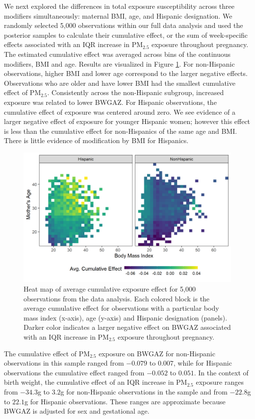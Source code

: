 \documentclass[12pt]{article}
\begin{document}
We next explored the differences in total exposure susceptibility across three modifiers simultaneously: maternal BMI, age, and Hispanic designation. We randomly selected 5,000 observations within our full data analysis and used the posterior samples to calculate their cumulative effect, or the sum of week-specific effects associated with an IQR increase in PM$_{2.5}$ exposure throughout pregnancy. The estimated cumulative effect was averaged across bins of the continuous modifiers, BMI and age. Results are visualized in Figure \ref{fig:avg_cumulative_effect}. For non-Hispanic observations, higher BMI and lower age correspond to the larger negative effects. Observations who are older and have lower BMI had the smallest cumulative effect of PM$_{2.5}$. Consistently across the non-Hispanic subgroup, increased exposure was related to lower BWGAZ. For Hispanic observations, the cumulative effect of exposure was centered around zero. We see evidence of a larger negative effect of exposure for younger Hispanic women; however this effect is less than the cumulative effect for non-Hispanics of the same age and BMI. There is little evidence of modification by BMI for Hispanics. 

\begin{figure}[!ht]
    \centering
    \includegraphics[height=7cm]{img/bwgaz_ce_heat_map.png}
    \caption{Heat map of average cumulative exposure effect for 5,000 observations from the data analysis. Each colored block is the average cumulative effect for observations with a particular body mass index (x-axis), age (y-axis) and Hispanic designation (panels). Darker color indicates a larger negative effect on BWGAZ associated with an IQR increase in PM$_{2.5}$ exposure throughout pregnancy.}
    \label{fig:avg_cumulative_effect}
\end{figure}

The cumulative effect of PM$_{2.5}$ exposure on BWGAZ for non-Hispanic observations in this sample ranged from $-0.079$ to $0.007$, while for Hispanic observations the cumulative effect ranged from $-0.052$ to $0.051$. In the context of birth weight, the cumulative effect of an IQR increase in PM$_{2.5}$ exposure ranges from $-34.3$g to $3.2$g for non-Hispanic observations in the sample and from $-22.8$g to $22.1$g for Hispanic observations. These ranges are approximate because BWGAZ is adjusted for sex and gestational age. 
\end{document}
